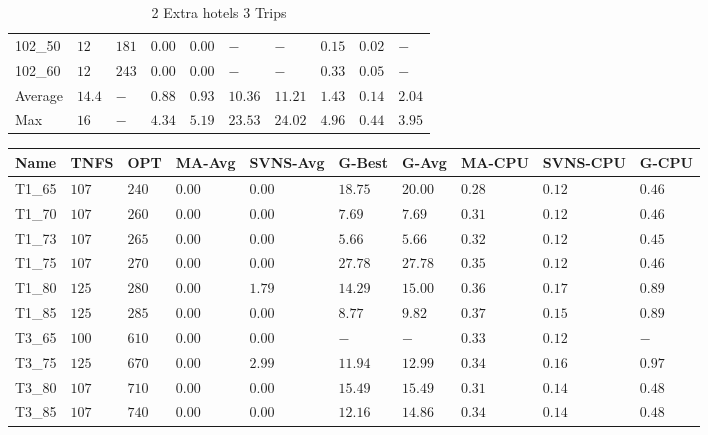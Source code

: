 \begin{center}
\begin{table}[]
\begin{tabular}{|lll|l|l|ll|lll|}
\hline
102\_50  & $12  $ & $181 $ & $\bm{0.00}  $ & $\bm{0.00}$ & $-    $ & $-    $ & $0.15  $ & $0.02    $ & $-        $ \\
102\_60  & $12  $ & $243 $ & $\bm{0.00}  $ & $\bm{0.00}$ & $-    $ & $-    $ & $0.33  $ & $0.05    $ & $-        $ \\
\hline
Average  & $14.4$ & $-   $ & $0.88  $ & $0.93$ & $10.36$ & $11.21$ & $1.43  $ & $0.14    $ & $2.04     $ \\
Max      & $16  $ & $-   $ & $4.34  $ & $5.19$ & $23.53$ & $24.02$ & $4.96  $ & $0.44    $ & $3.95     $ \\
\hline
\end{tabular}
\caption{2 Extra hotels 3 Trips}
\label{2-3}
\end{table}
\end{center}
\begin{center}
\begin{table}[]
\centering
\begin{tabular}{|lll|l|l|ll|lll|}
\hline
Name    & TNFS    & OPT    & MA-Avg & SVNS-Avg & G-Best  & G-Avg   & MA-CPU & SVNS-CPU & G-CPU \\
\hline
T1\_65  & $107  $ & $240 $ & $\bm{0.00}$ & $\bm{0.00}$   & $18.75$ & $20.00$ & $0.28$ & $0.12$   & $0.46$ \\
T1\_70  & $107  $ & $260 $ & $\bm{0.00}$ & $\bm{0.00}$   & $7.69$  & $7.69$  & $0.31$ & $0.12$   & $0.46$ \\
T1\_73  & $107  $ & $265 $ & $\bm{0.00}$ & $\bm{0.00}$   & $5.66$  & $5.66$  & $0.32$ & $0.12$   & $0.45$ \\
T1\_75  & $107  $ & $270 $ & $\bm{0.00}$ & $\bm{0.00}$   & $27.78$ & $27.78$ & $0.35$ & $0.12$   & $0.46$ \\
T1\_80  & $125  $ & $280 $ & $\bm{0.00}$ & $1.79$   & $14.29$ & $15.00$ & $0.36$ & $0.17$   & $0.89$ \\
T1\_85  & $125  $ & $285 $ & $\bm{0.00}$ & $\bm{0.00}$   & $8.77$  & $9.82$  & $0.37$ & $0.15$   & $0.89$ \\
\hline
T3\_65  & $100  $ & $610 $ & $\bm{0.00}$ & $\bm{0.00}$   & $-$     & $-$     & $0.33$ & $0.12$   & $-   $ \\
T3\_75  & $125  $ & $670 $ & $\bm{0.00}$ & $2.99$   & $11.94$ & $12.99$ & $0.34$ & $0.16$   & $0.97$ \\
T3\_80  & $107  $ & $710 $ & $\bm{0.00}$ & $\bm{0.00}$   & $15.49$ & $15.49$ & $0.31$ & $0.14$   & $0.48$ \\
T3\_85  & $107  $ & $740 $ & $\bm{0.00}$ & $\bm{0.00}$   & $12.16$ & $14.86$ & $0.34$ & $0.14$   & $0.48$ \\

\end{tabular}
\end{table}
\end{center}
